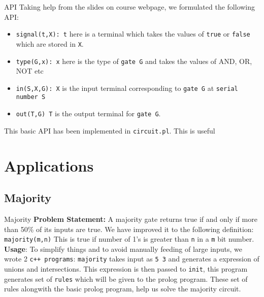 \documentclass{beamer}
\begin{document}
\begin{frame}{API}
Taking help from the slides on course webpage, we formulated the following API:
\begin{itemize}
\item \texttt{signal(t,X): t}  here is a terminal which takes the values of \texttt{true} or \texttt{false} which are stored in \texttt{X}.

\item \texttt{type(G,x): x} here is the type of \texttt{gate G} and takes the values of AND, OR, NOT etc

\item  \texttt{in(S,X,G): X} is the input terminal corresponding to \texttt{gate G} at \texttt{serial number S}
\item \texttt{out(T,G) T} is the output terminal for \texttt{gate G}.
\end{itemize}
This basic API has been implemented in \texttt{circuit.pl}. This is useful
\end{frame}


\section{Applications}
\subsection{Majority}
\begin{frame}{Majority}
\textbf{Problem Statement:} A majority gate returns true if and only if more than 50\% of its inputs are true. We have improved it to the following definition:
\newline
\texttt{majority(m,n)} This is true if number of 1's is greater than \texttt{n} in a \texttt{m} bit number.
\newline \newline
\textbf{Usage}: 
To simplify things and to avoid manually feeding of large inputs, we wrote 2 \texttt{c++ programs}: \newline \texttt{majority} takes input as \texttt{5  3} and generates a expression of unions and intersections.
This expression is then passed to \texttt{init}, this program generates set of \texttt{rules} which will be given to the prolog program.
These set of rules alongwith the basic prolog program, help us solve the majority circuit.
\end{frame}
\end{document}
